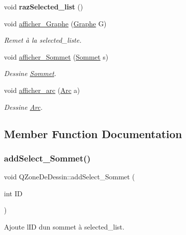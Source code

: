 \begin{DoxyCompactItemize}
\mbox{\label{classQZoneDeDessin_a181f55b49970b999f689314b394eef3d}} 
void {\bfseries raz\+Selected\+\_\+list} ()
\item 
void \hyperlink{classQZoneDeDessin_a71e84d55e8787ab3bc6f214714eb6cbd}{afficher\+\_\+\+Graphe} (\hyperlink{classGraphe}{Graphe} G)
\begin{DoxyCompactList}\small\item\em Remet \`{a} la selected\+\_\+liste. \end{DoxyCompactList}\item 
void \hyperlink{classQZoneDeDessin_a12f10a0404159fbd4447a136461f1086}{afficher\+\_\+\+Sommet} (\hyperlink{classSommet}{Sommet} s)
\begin{DoxyCompactList}\small\item\em Dessine \hyperlink{classSommet}{Sommet}. \end{DoxyCompactList}\item 
void \hyperlink{classQZoneDeDessin_aa500ad8e2c45c43d8d729b3cf64271e2}{afficher\+\_\+arc} (\hyperlink{classArc}{Arc} a)
\begin{DoxyCompactList}\small\item\em Dessine \hyperlink{classArc}{Arc}. \end{DoxyCompactList}\end{DoxyCompactItemize}


\subsection{Member Function Documentation}
\mbox{\label{classQZoneDeDessin_a92f0d082808add86596dbab5955cc8f4}} 
\subsubsection{\texorpdfstring{add\+Select\+\_\+\+Sommet()}{addSelect\_Sommet()}}
{\footnotesize\ttfamily void Q\+Zone\+De\+Dessin\+::add\+Select\+\_\+\+Sommet (\begin{DoxyParamCaption}\item[{int}]{ID }\end{DoxyParamCaption})}



Ajoute l\textquotesingle{}ID d\textquotesingle{}un sommet \`{a} selected\+\_\+list. 


